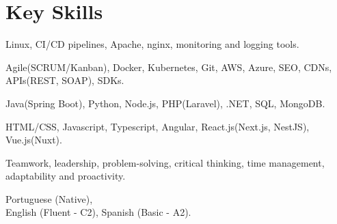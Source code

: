 \section{Key Skills}
{Linux, CI/CD pipelines, Apache, nginx, monitoring and logging tools.}

{Agile(SCRUM/Kanban), Docker, Kubernetes, Git, AWS, Azure, SEO, CDNs, APIs(REST, SOAP), SDKs.}

{Java(Spring Boot), Python, Node.js, PHP(Laravel), .NET, SQL, MongoDB.}

{HTML/CSS, Javascript, Typescript, Angular, React.js(Next.js, NestJS), Vue.js(Nuxt).}

{Teamwork, leadership, problem-solving, critical thinking, time management, adaptability and proactivity.}

{Portuguese (Native), \\ English (Fluent - C2), Spanish (Basic - A2).}
